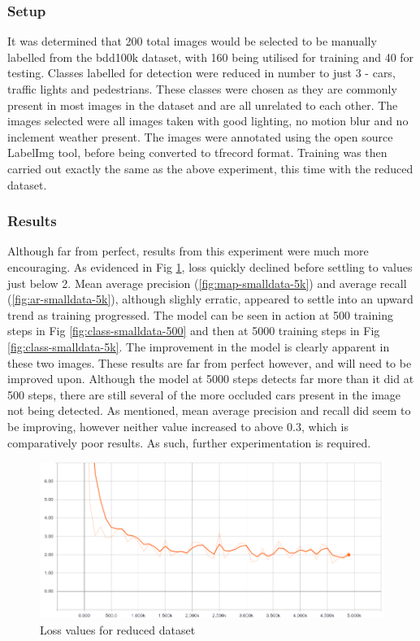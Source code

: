 \documentclass[12pt]{report}
\begin{document}
\subsubsection{Setup}
\begin{flushleft}
It was determined that 200 total images would be selected to be manually labelled from the bdd100k dataset, with 160 being utilised for training and 40 for testing. Classes labelled for detection were reduced in number to just 3 - cars, traffic lights and pedestrians. These classes were chosen as they are commonly present in most images in the dataset and are all unrelated to each other. The images selected were all images taken with good lighting, no motion blur and no inclement weather present. The images were annotated using the open source LabelImg tool, before being converted to tfrecord format. Training was then carried out exactly the same as the above experiment, this time with the reduced dataset.
\end{flushleft}

\subsubsection{Results}
\begin{flushleft}
Although far from perfect, results from this experiment were much more encouraging. As evidenced in Fig \ref{fig:loss-smalldata-5k}, loss quickly declined before settling to values just below 2. Mean average precision (\ref{fig:map-smalldata-5k}) and average recall (\ref{fig:ar-smalldata-5k}), although slighly erratic, appeared to settle into an upward trend as training progressed. The model can be seen in action at 500 training steps in Fig \ref{fig:class-smalldata-500} and then at 5000 training steps in Fig \ref{fig:class-smalldata-5k}. The improvement in the model is clearly apparent in these two images. These results are far from perfect however, and will need to be improved upon. Although the model at 5000 steps detects far more than it did at 500 steps, there are still several of the more occluded cars present in the image not being detected. As mentioned, mean average precision and recall did seem to be improving, however neither value increased to above 0.3, which is comparatively poor results. As such, further experimentation is required.
\end{flushleft}

\vspace{0.5cm}
\begin{figure}[h]
	\centering
	\includegraphics[width=12cm]{loss-smalldata-5k}
	\caption{Loss values for reduced dataset}
	\label{fig:loss-smalldata-5k}
\end{figure}
\end{document}
